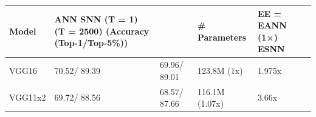 \begin{tabular}{lllll}
\toprule
Model & ANN SNN (T = 1) (T = 2500) (Accuracy (Top-1/Top-5\%)) &  & \# Parameters & EE = EANN (1×) ESNN \\
\midrule
VGG16 & 70.52/ 89.39 & 69.96/ 89.01 & 123.8M (1x) & 1.975x \\
VGG11x2 & 69.72/ 88.56 & 68.57/ 87.66 & 116.1M (1.07x) & 3.66x \\
\bottomrule
\end{tabular}
